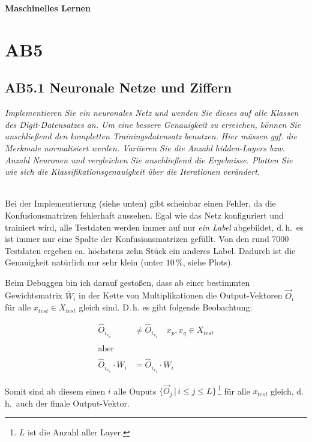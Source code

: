 \documentclass[a4paper,11pt]{article}
\renewcommand\dh{d.\,h.\ }
\newcommand\parbig{\par\bigskip}
\newcommand{\task}[1]{{\parbig\textit{#1}}\\[1mm]}
\newcommand{\protocolnumber}{AB5}
\begin{document}
\begin{center}
{\bf \LARGE Maschinelles Lernen}\\[4mm]
\end{center}

\section*{\protocolnumber}
\vspace*{5mm}


\subsection*{\protocolnumber.1 Neuronale Netze und Ziffern}
\task{Implementieren Sie ein neuronales Netz und wenden Sie dieses auf alle Klassen des Digit-Datensatzes an. Um eine bessere Genauigkeit zu erreichen, können Sie anschließend den kompletten Trainingsdatensatz benutzen. Hier müssen ggf. die Merkmale normalisiert werden. Variieren Sie die Anzahl hidden-Layers bzw. Anzahl Neuronen und vergleichen Sie anschließend die Ergebnisse. Plotten Sie wie sich die Klassifikationsgenauigkeit über die Iterationen verändert.}

Bei der Implementierung (siehe unten) gibt scheinbar einen Fehler, da die Konfusionsmatrizen fehlerhaft aussehen.
Egal wie das Netz konfiguriert und trainiert wird, alle Testdaten werden immer auf nur \textit{ein Label} abgebildet, \dh es ist immer nur eine Spalte der Konfusionsmatrizen gefüllt.
Von den rund 7000 Testdaten ergeben ca. höchstens zehn Stück ein anderes Label.
Dadurch ist die Genauigkeit natürlich nur sehr klein (unter $10\,\%$, siehe Plots).

Beim Debuggen bin ich darauf gestoßen, dass ab einer bestimmten Gewichtsmatrix $\overline{W}_i$ in der Kette von Multiplikationen die Output-Vektoren $\overrightarrow{O}_i$ für alle $x_{test} \in X_{test}$ gleich sind.
D.\,h. es gibt folgende Beobachtung:

\begin{align*}
    \hat{O}_i_{x_p} & \neq \hat{O}_i_{x_q} \quad x_p, x_q \in X_{test}\\
    \\
    \text{aber}\\
    \\
    \hat{O}_i_{x_p} \cdot \overline{W}_i & = \hat{O}_i_{x_q} \cdot \overline{W}_i
\end{align*}

Somit sind ab diesem einen $i$ alle Ouputs $\{\overrightarrow{O}_j \, | \, i \leq j \leq L\}\,$\footnote{$L$ ist die Anzahl aller Layer.} für alle $x_{test}$ gleich, \dh auch der finale Output-Vektor.
\end{document}
